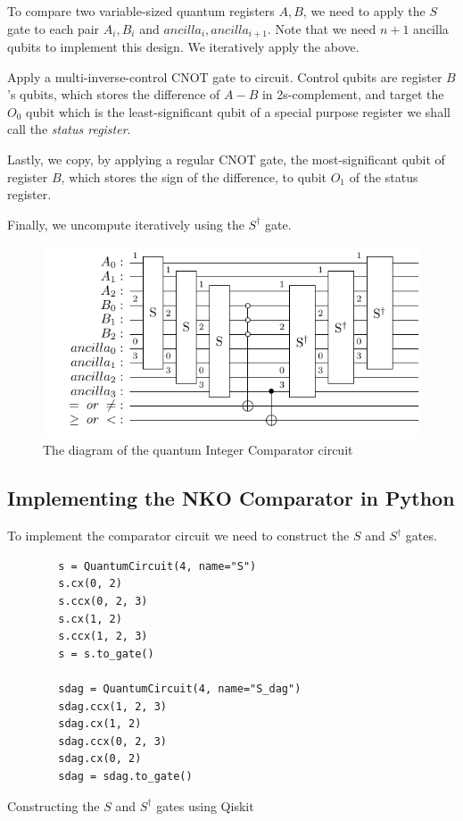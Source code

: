 To compare two variable-sized quantum registers $A, B$, we need to apply the $S$ gate to 
each pair $A_i,B_i$ and $ancilla_i,ancilla_{i+1}$. Note that we need $n+1$ ancilla qubits
to implement this design. We iteratively apply the above.

Apply a multi-inverse-control CNOT gate to circuit. Control qubits are register $B$'s qubits,
which stores the difference of $A-B$ in 2s-complement, and target the $O_0$ qubit which is the
least-significant qubit of a special purpose register we shall call the \textit{status register}.

Lastly, we copy, by applying a regular CNOT gate, the most-significant qubit of register $B$,
which stores the sign of the difference, to qubit $O_1$ of the status register.

Finally, we uncompute iteratively using the $S^\dag$ gate.

\begin{figure}[ht]
    \centering
    \includegraphics{images/5_Implementation/nko_comparator.pdf}
    \caption{The diagram of the quantum Integer Comparator circuit}
\end{figure}

\subsection{Implementing the NKO Comparator in Python}

To implement the comparator circuit we need to construct the $S$ and $S^\dag$ gates.

\begin{listing}[ht]
    \centering
    \begin{verbatim}
        s = QuantumCircuit(4, name="S")
        s.cx(0, 2)
        s.ccx(0, 2, 3)
        s.cx(1, 2)
        s.ccx(1, 2, 3)
        s = s.to_gate()

        sdag = QuantumCircuit(4, name="S_dag")
        sdag.ccx(1, 2, 3)
        sdag.cx(1, 2)
        sdag.ccx(0, 2, 3)
        sdag.cx(0, 2)
        sdag = sdag.to_gate()
    \end{verbatim}
    \caption{Constructing the $S$ and $S^\dag$ gates using Qiskit}
\end{listing}

